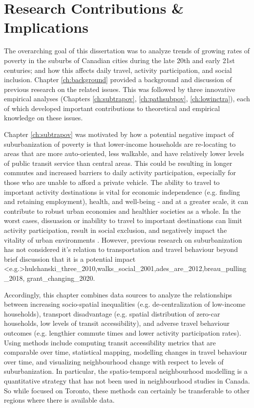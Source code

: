 
\section{Research Contributions \& Implications}

The overarching goal of this dissertation was to analyze trends of growing rates of poverty in the suburbs of Canadian cities during the late 20th and early 21st centuries; and how this affects daily travel, activity participation, and social inclusion. Chapter \ref{ch:background} provided a background and discussion of previous research on the related issues. This was followed by three innovative empirical analyses (Chapters \ref{ch:subtrapov}, \ref{ch:pathsubpov}, \ref{ch:lowinctra}), each of which developed important contributions to theoretical and empirical knowledge on these issues.

Chapter \ref{ch:subtrapov} was motivated by how a potential negative impact of suburbanization of poverty is that lower-income households are re-locating to areas that are more auto-oriented, less walkable, and have relatively lower levels of public transit service than central areas. This could be resulting in longer commutes and increased barriers to daily activity participation, especially for those who are unable to afford a private vehicle. The ability to travel to important activity destinations is vital for economic independence (e.g. finding and retaining employment), health, and well-being - and at a greater scale, it can contribute to robust urban economies and healthier societies as a whole. In the worst cases, dissuasion or inability to travel to important destinations can limit activity participation, result in social exclusion, and negatively impact the vitality of urban environments \cite{lucas_transport_2012,martens_transport_2016}. However, previous research on suburbanization has not considered it's relation to transportation and travel behaviour beyond brief discussion that it is a potential impact \shortcite<e.g.>{hulchanski_three_2010,walks_social_2001,ades_are_2012,breau_pulling_2018, grant_changing_2020}. 

Accordingly, this chapter combines data sources to analyze the relationships between increasing socio-spatial inequalities (e.g. de-centralization of low-income households), transport disadvantage (e.g. spatial distribution of zero-car households, low levels of transit accessibility), and adverse travel behaviour outcomes (e.g. lengthier commute times and lower activity participation rates). Using methods include computing transit accessibility metrics that are comparable over time, statistical mapping, modelling changes in travel behaviour over time, and visualizing neighbourhood change with respect to levels of suburbanization. In particular, the spatio-temporal neighbourhood modelling is a quantitative strategy that has not been used in neighbourhood studies in Canada. So while focused on Toronto, these methods can certainly be transferable to other regions where there is available data.

